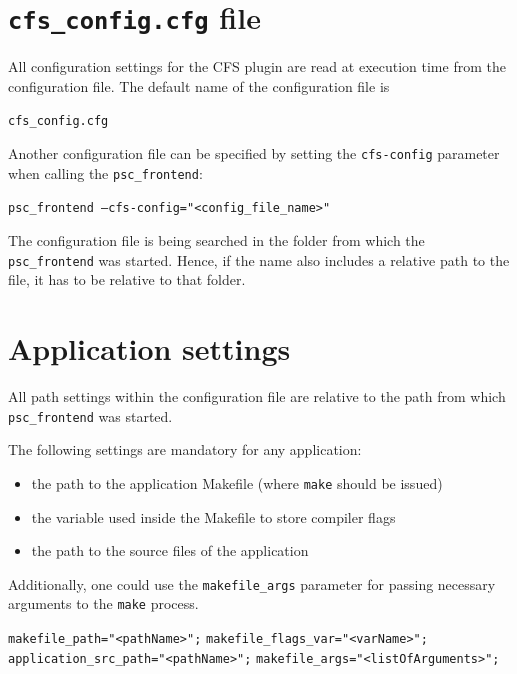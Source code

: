 \documentclass[11pt,a4paper, oneside]{book} %
\begin{document}
\section{\texttt{cfs\_config.cfg} file}
All configuration settings for the CFS plugin are read at execution time from the configuration file. The default name of the configuration file is
\begin{center}
\texttt{cfs\_config.cfg}
\end{center}

Another configuration file can be specified by setting the \texttt{cfs-config} parameter when calling the \texttt{psc\_frontend}:
\begin{center}
\texttt{psc\_frontend --cfs-config="<config\_file\_name>"}
\end{center}

The configuration file is being searched in the folder from which the \texttt{psc\_frontend} was started. Hence, if the name also includes a relative path to the file, it has to be relative to that folder.

\section{Application settings}
All path settings within the configuration file are relative to the path from which \texttt{psc\_frontend} was started.

The following settings are mandatory for any application:

\begin{itemize}
	\item the path to the application Makefile (where \texttt{make} should be issued)
	\item the variable used inside the Makefile to store compiler flags

	\item the path to the source files of the application

\end{itemize}

Additionally, one could use the \texttt{makefile\_args} parameter for passing necessary arguments to the \texttt{make} process.

    \begin{center}
    \begin{minipage}{0.8\textwidth}
    	\texttt{makefile\_path="<pathName>";}
    	\texttt{makefile\_flags\_var="<varName>";}
    	\texttt{application\_src\_path="<pathName>";}
        \texttt{makefile\_args="<listOfArguments>";}
    \end{minipage}
    \end{center}
\end{document}
